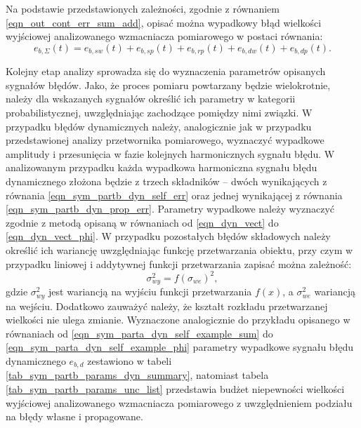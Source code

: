Na podstawie przedstawionych zależności, zgodnie z równaniem \eqref{eqn_out_cont_err_sum_add}, opisać można wypadkowy błąd wielkości wyjściowej analizowanego wzmacniacza pomiarowego w postaci równania:
\begin{equation}
e_{b,\Sigma}(t) = e_{b,sw}(t) + e_{b,sp}(t) + e_{b,rp}(t) + e_{b,dw}(t) + e_{b,dp}(t) \label{eqn_sym_partb_error_sum}.
\end{equation}

Kolejny etap analizy sprowadza się do wyznaczenia parametrów opisanych sygnałów błędów. Jako, że proces pomiaru powtarzany będzie wielokrotnie, należy dla wskazanych sygnałów określić ich parametry w kategorii probabilistycznej, uwzględniając zachodzące pomiędzy nimi związki. W przypadku błędów dynamicznych należy, analogicznie jak w przypadku przedstawionej analizy przetwornika pomiarowego, wyznaczyć wypadkowe amplitudy i przesunięcia w fazie kolejnych harmonicznych sygnału błędu. W analizowanym przypadku każda wypadkowa harmoniczna sygnału błędu dynamicznego złożona będzie z trzech składników -- dwóch wynikających z równania \eqref{eqn_sym_partb_dyn_self_err} oraz jednej wynikającej z równania \eqref{eqn_sym_partb_dyn_prop_err}. Parametry wypadkowe należy wyznaczyć zgodnie z metodą opisaną w równaniach od \eqref{eqn_dyn_vect} do \eqref{eqn_dyn_vect_phi}. W przypadku pozostałych błędów składowych należy określić ich wariancję uwzględniając funkcję przetwarzania obiektu, przy czym w przypadku liniowej i addytywnej funkcji przetwarzania zapisać można zależność:
\begin{equation}
\sigma_{wy}^{2} = f(\sigma_{we})^{2} \label{eqn_var_function},
\end{equation}
gdzie $\sigma_{wy}^{2}$ jest wariancją na wyjściu funkcji przetwarzania $f(x)$, a $\sigma_{we}^{2}$ wariancją na wejściu. Dodatkowo zauważyć należy, że kształt rozkładu przetwarzanej wielkości nie ulega zmianie. Wyznaczone analogicznie do przykładu opisanego w równaniach od \eqref{eqn_sym_parta_dyn_self_example_sum} do \eqref{eqn_sym_parta_dyn_self_example_phi} parametry wypadkowe sygnału błędu dynamicznego $e_{b,d}$ zestawiono w tabeli \ref{tab_sym_partb_params_dyn_summary}, natomiast tabela \ref{tab_sym_partb_params_unc_list} przedstawia budżet niepewności wielkości wyjściowej analizowanego wzmacniacza pomiarowego z uwzględnieniem podziału na błędy własne i propagowane.

